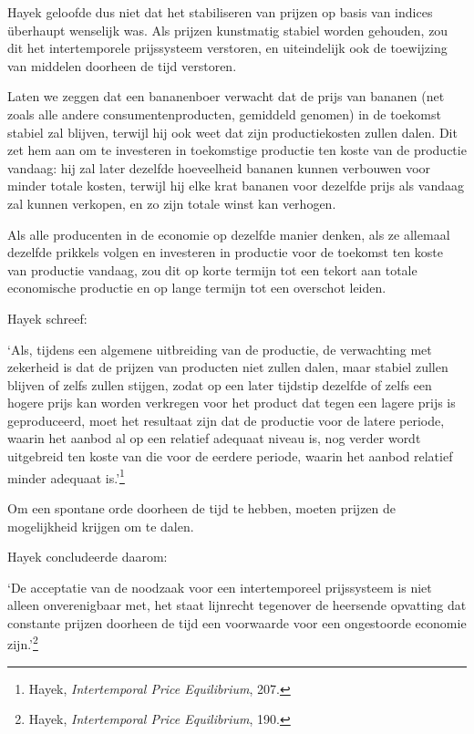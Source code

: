 \documentclass[
  a5paper,
  smalldemyvopaper,11pt,twoside,onecolumn,openright,extrafontsizes,
hidelinks]{memoir}
\renewenvironment{quote}%
               {\list{}{\rightmargin=.3cm\leftmargin=.3cm}%
                \itshape \item[]}%
               {\endlist}
\begin{document}
Hayek geloofde dus niet dat het stabiliseren van prijzen op basis van
indices überhaupt wenselijk was. Als prijzen kunstmatig stabiel worden
gehouden, zou dit het intertemporele prijssysteem verstoren, en
uiteindelijk ook de toewijzing van middelen doorheen de tijd verstoren.

Laten we zeggen dat een bananenboer verwacht dat de prijs van bananen
(net zoals alle andere consumentenproducten, gemiddeld genomen) in de
toekomst stabiel zal blijven, terwijl hij ook weet dat zijn
productiekosten zullen dalen. Dit zet hem aan om te investeren in
toekomstige productie ten koste van de productie vandaag: hij zal later
dezelfde hoeveelheid bananen kunnen verbouwen voor minder totale kosten,
terwijl hij elke krat bananen voor dezelfde prijs als vandaag zal kunnen
verkopen, en zo zijn totale winst kan verhogen.

Als alle producenten in de economie op dezelfde manier denken, als ze
allemaal dezelfde prikkels volgen en investeren in productie voor de
toekomst ten koste van productie vandaag, zou dit op korte termijn tot
een tekort aan totale economische productie en op lange termijn tot een
overschot leiden.

Hayek schreef:

\begin{quote}
`Als, tijdens een algemene uitbreiding van de productie, de verwachting
met zekerheid is dat de prijzen van producten niet zullen dalen, maar
stabiel zullen blijven of zelfs zullen stijgen, zodat op een later
tijdstip dezelfde of zelfs een hogere prijs kan worden verkregen voor
het product dat tegen een lagere prijs is geproduceerd, moet het
resultaat zijn dat de productie voor de latere periode, waarin het
aanbod al op een relatief adequaat niveau is, nog verder wordt
uitgebreid ten koste van die voor de eerdere periode, waarin het aanbod
relatief minder adequaat is.'\footnote{\hspace{0pt}Hayek,
  \emph{Intertemporal Price Equilibrium}, 207.}
\end{quote}

Om een spontane orde doorheen de tijd te hebben, moeten prijzen de
mogelijkheid krijgen om te dalen.

Hayek concludeerde daarom:

\begin{quote}
`De acceptatie van de noodzaak voor een intertemporeel prijssysteem is
niet alleen onverenigbaar met, het staat lijnrecht tegenover de
heersende opvatting dat constante prijzen doorheen de tijd een
voorwaarde voor een ongestoorde economie zijn.'\footnote{\hspace{0pt}Hayek,
  \emph{Intertemporal Price Equilibrium}, 190.}
\end{quote}
\end{document}
